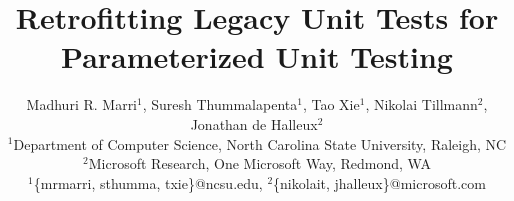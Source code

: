 \documentclass{sig-alternate}
\begin{document}
\title{Retrofitting Legacy Unit Tests for Parameterized Unit Testing}

\author{Madhuri R. Marri$^1$, Suresh Thummalapenta$^1$, Tao Xie$^1$, Nikolai Tillmann$^2$, Jonathan de Halleux$^2$\\
\small{$^1$Department of Computer Science, North Carolina State University, Raleigh, NC}\\
\small{$^2$Microsoft Research, One Microsoft Way, Redmond, WA}\\
\small{$^1$\{mrmarri, sthumma, txie\}@ncsu.edu, $^2$\{nikolait, jhalleux\}@microsoft.com}\\}
\maketitle
\end{document}
